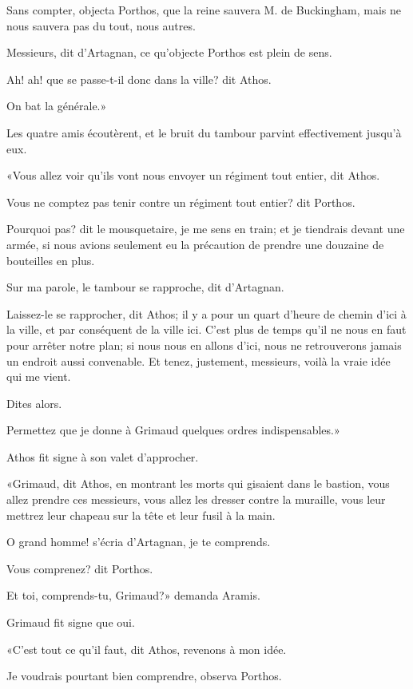 \speak  Sans compter, objecta Porthos, que la reine sauvera M. de Buckingham, mais ne nous sauvera pas du tout, nous autres. 

\speak  Messieurs, dit d'Artagnan, ce qu'objecte Porthos est plein de sens. 

\speak  Ah! ah! que se passe-t-il donc dans la ville? dit Athos. 

\speak  On bat la générale.» 

Les quatre amis écoutèrent, et le bruit du tambour parvint effectivement jusqu'à eux. 

«Vous allez voir qu'ils vont nous envoyer un régiment tout entier, dit Athos. 

\speak  Vous ne comptez pas tenir contre un régiment tout entier? dit Porthos. 

\speak  Pourquoi pas? dit le mousquetaire, je me sens en train; et je tiendrais devant une armée, si nous avions seulement eu la précaution de prendre une douzaine de bouteilles en plus. 

\speak  Sur ma parole, le tambour se rapproche, dit d'Artagnan. 

\speak  Laissez-le se rapprocher, dit Athos; il y a pour un quart d'heure de chemin d'ici à la ville, et par conséquent de la ville ici. C'est plus de temps qu'il ne nous en faut pour arrêter notre plan; si nous nous en allons d'ici, nous ne retrouverons jamais un endroit aussi convenable. Et tenez, justement, messieurs, voilà la vraie idée qui me vient. 

\speak  Dites alors. 

\speak  Permettez que je donne à Grimaud quelques ordres indispensables.» 

Athos fit signe à son valet d'approcher. 

«Grimaud, dit Athos, en montrant les morts qui gisaient dans le bastion, vous allez prendre ces messieurs, vous allez les dresser contre la muraille, vous leur mettrez leur chapeau sur la tête et leur fusil à la main. 

\speak  O grand homme! s'écria d'Artagnan, je te comprends. 

\speak  Vous comprenez? dit Porthos. 

\speak  Et toi, comprends-tu, Grimaud?» demanda Aramis. 

Grimaud fit signe que oui. 

«C'est tout ce qu'il faut, dit Athos, revenons à mon idée. 

\speak  Je voudrais pourtant bien comprendre, observa Porthos. 

